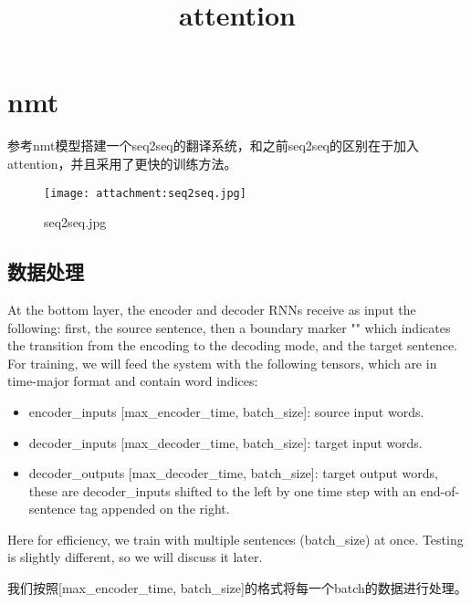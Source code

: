 \documentclass[11pt]{article}
\title{attention}
\makeatletter
\def\maxwidth{\ifdim\Gin@nat@width>\linewidth\linewidth
    \else\Gin@nat@width\fi}
\let\Oldincludegraphics\includegraphics
\renewcommand{\includegraphics}[1]{\Oldincludegraphics[width=.8\maxwidth]{#1}}
\providecommand{\tightlist}{%
      \setlength{\itemsep}{0pt}\setlength{\parskip}{0pt}}
\makeatother
\begin{document}
    
    
    \maketitle
    
    

    
    \section{nmt}\label{nmt}

参考nmt模型搭建一个seq2seq的翻译系统，和之前seq2seq的区别在于加入attention，并且采用了更快的训练方法。

\begin{figure}
\centering
\texttt{[image: attachment:seq2seq.jpg]}
\caption{seq2seq.jpg}
\end{figure}

\subsection{数据处理}\label{ux6570ux636eux5904ux7406}

At the bottom layer, the encoder and decoder RNNs receive as input the
following: first, the source sentence, then a boundary marker "" which
indicates the transition from the encoding to the decoding mode, and the
target sentence. For training, we will feed the system with the
following tensors, which are in time-major format and contain word
indices:

\begin{itemize}
\tightlist
\item
  encoder\_inputs {[}max\_encoder\_time, batch\_size{]}: source input
  words.
\item
  decoder\_inputs {[}max\_decoder\_time, batch\_size{]}: target input
  words.
\item
  decoder\_outputs {[}max\_decoder\_time, batch\_size{]}: target output
  words, these are decoder\_inputs shifted to the left by one time step
  with an end-of-sentence tag appended on the right.
\end{itemize}

Here for efficiency, we train with multiple sentences (batch\_size) at
once. Testing is slightly different, so we will discuss it later.

我们按照{[}max\_encoder\_time,
batch\_size{]}的格式将每一个batch的数据进行处理。
\end{document}
